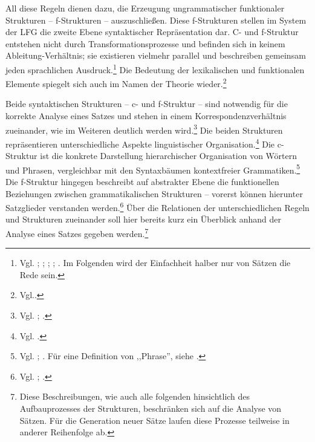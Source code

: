 \documentclass[12pt,a4paper]{article}
\begin{document}
All diese Regeln dienen dazu, die Erzeugung ungrammatischer funktionaler Strukturen -- f-Strukturen -- auszuschließen. Diese f-Strukturen stellen im System der LFG die zweite Ebene syntaktischer Repräsentation dar. C- und f-Struktur entstehen nicht durch Transformationsprozesse und befinden sich in keinem Ableitung-Verhältnis; sie existieren vielmehr parallel und beschreiben gemeinsam jeden sprachlichen Ausdruck.\footnote{Vgl. \cite[64]{Falk}; \cite[8]{Skript}; \cite[2; 4; 7]{Dal}; \cite[vii (preface)]{Bresnan}; \cite[11; 13]{Rohrer}. Im Folgenden wird der Einfachheit halber nur von Sätzen die Rede sein.} Die Bedeutung der lexikalischen und funktionalen Elemente spiegelt sich auch im Namen der Theorie wieder.\footnote{Vgl.\cite[3]{Dal}.}

Beide syntaktischen Strukturen -- c- und f-Struktur -- sind notwendig für die korrekte Analyse eines Satzes und stehen in einem Korrespondenzverhältnis zueinander, wie im Weiteren deutlich werden wird.\footnote{Vgl. \cite[3]{Dal}; \cite[4]{Skript}.} Die beiden Strukturen repräsentieren unterschiedliche Aspekte linguistischer Organisation.\footnote{Vgl. \cite[1]{Dal}.} Die c-Struktur ist die konkrete Darstellung hierarchischer Organisation von Wörtern und Phrasen, vergleichbar mit den Syntaxbäumen kontextfreier Grammatiken.\footnote{Vgl. \cite[7]{Dal}; \cite[13]{Rohrer}. Für eine Definition von ,,Phrase'', siehe \cite[5]{Bresnan}.} Die f-Struktur hingegen beschreibt auf abstrakter Ebene die funktionellen Beziehungen zwischen grammatikalischen Strukturen -- vorerst können hierunter Satzglieder verstanden werden.\footnote{Vgl. \cite[7]{Dal}; \cite[4]{Skript}.} Über die Relationen der unterschiedlichen Regeln und Strukturen zueinander soll hier bereits kurz ein Überblick anhand der Analyse eines Satzes gegeben werden.\footnote{Diese Beschreibungen, wie auch alle folgenden hinsichtlich des Aufbauprozesses der Strukturen, beschränken sich auf die Analyse von Sätzen. Für die Generation neuer Sätze laufen diese Prozesse teilweise in anderer Reihenfolge ab.}
\end{document}
